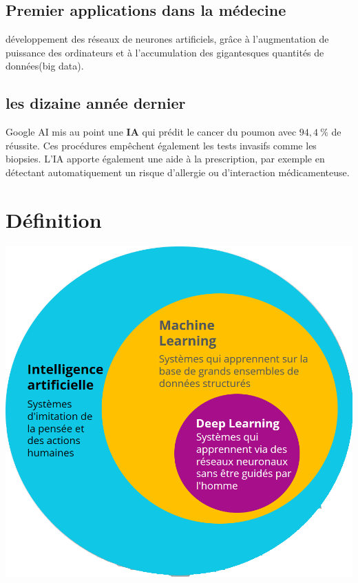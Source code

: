 \subsection{Premier applications dans la médecine}
    développement des réseaux de neurones artificiels, grâce à l'augmentation
    de puissance des ordinateurs et à l'accumulation des gigantesques quantités
    de données(big data).

\subsection{les dizaine année dernier}
    Google AI mis au point une \textbf{IA} qui prédit le cancer du poumon avec
    $94,4~\%$ de réussite. Ces procédures empêchent également les tests invasifs comme les biopsies.
    L'IA apporte également une aide à la prescription, par exemple
    en détectant automatiquement un risque d'allergie ou
    d'interaction médicamenteuse.

\section{Définition}
{
\includegraphics[height=\textwidth,width=\textwidth]{photo/ai1a.png}
}


